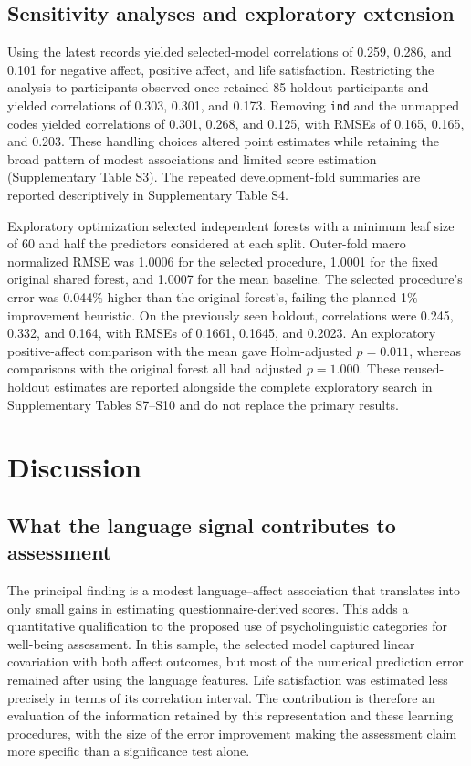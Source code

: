 \subsection{Sensitivity analyses and exploratory extension}
Using the latest records yielded selected-model correlations of 0.259, 0.286, and 0.101 for negative affect, positive affect, and life satisfaction. Restricting the analysis to participants observed once retained 85 holdout participants and yielded correlations of 0.303, 0.301, and 0.173. Removing \texttt{ind} and the unmapped codes yielded correlations of 0.301, 0.268, and 0.125, with RMSEs of 0.165, 0.165, and 0.203. These handling choices altered point estimates while retaining the broad pattern of modest associations and limited score estimation (Supplementary Table S3). The repeated development-fold summaries are reported descriptively in Supplementary Table S4.

Exploratory optimization selected independent forests with a minimum leaf size of 60 and half the predictors considered at each split. Outer-fold macro normalized RMSE was 1.0006 for the selected procedure, 1.0001 for the fixed original shared forest, and 1.0007 for the mean baseline. The selected procedure's error was 0.044\% higher than the original forest's, failing the planned 1\% improvement heuristic. On the previously seen holdout, correlations were 0.245, 0.332, and 0.164, with RMSEs of 0.1661, 0.1645, and 0.2023. An exploratory positive-affect comparison with the mean gave Holm-adjusted $p=0.011$, whereas comparisons with the original forest all had adjusted $p=1.000$. These reused-holdout estimates are reported alongside the complete exploratory search in Supplementary Tables S7--S10 and do not replace the primary results.

\section{Discussion}
\subsection{What the language signal contributes to assessment}
The principal finding is a modest language--affect association that translates into only small gains in estimating questionnaire-derived scores. This adds a quantitative qualification to the proposed use of psycholinguistic categories for well-being assessment. In this sample, the selected model captured linear covariation with both affect outcomes, but most of the numerical prediction error remained after using the language features. Life satisfaction was estimated less precisely in terms of its correlation interval. The contribution is therefore an evaluation of the information retained by this representation and these learning procedures, with the size of the error improvement making the assessment claim more specific than a significance test alone.

